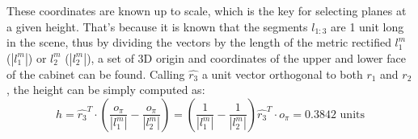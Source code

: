 These coordinates are known up to scale, which is the key for selecting planes at a given height. That's because it is known that the segments $l_{1:3}$ are 1 unit long in the scene, thus by dividing the vectors by the length of the metric rectified  $l_1^m$ ($|l_1^m|$) or $l_2^m$ ($|l_2^m|$), a set of 3D origin and coordinates of the upper and lower face of the cabinet can be found. Calling $\hat{r_3}$ a unit vector orthogonal to both $r_1$ and $r_2$, the height can be simply computed as:
$$
h = \hat{r_3}^T \cdot (\frac{o_\pi}{|l_1^m|} - \frac{o_\pi}{|l_2^m|}) = (\frac{1}{|l_1^m|} - \frac{1}{|l_2^m|}) \hat{r_3}^T \cdot o_\pi = 0.3842 \text{ units}
$$

